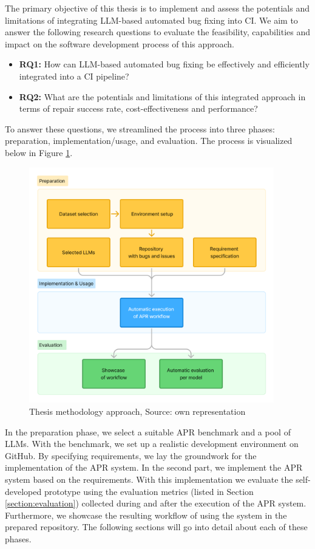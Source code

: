 The primary objective of this thesis is to implement and assess the potentials and limitations of integrating LLM-based automated bug fixing into \ac{CI}. We aim to answer the following research questions to evaluate the feasibility, capabilities and impact on the software development process of this approach.

\begin{itemize}
    \item \textbf{RQ1:} How can LLM-based automated bug fixing be effectively and efficiently integrated into a CI pipeline?
    \item \textbf{RQ2:} What are the potentials and limitations of this integrated approach in terms of repair success rate, cost-effectiveness and performance?
\end{itemize}

To answer these questions, we streamlined the process into three phases: preparation, implementation/usage, and evaluation. The process is visualized below in Figure \ref{fig:method-overview}.

\begin{figure}[H]
    \centering
    \includegraphics[width=0.95\textwidth]{images/flowcharts/method.png}
    \caption{Thesis methodology approach, Source: own representation}
    \label{fig:method-overview}
\end{figure}

In the preparation phase, we select a suitable \ac{APR} benchmark and a pool of \acp{LLM}. With the benchmark, we set up a realistic development environment on GitHub. By specifying requirements, we lay the groundwork for the implementation of the APR system.
In the second part, we implement the \ac{APR} system based on the requirements.
With this implementation we evaluate the self-developed prototype using the evaluation metrics (listed in Section \ref{section:evaluation}) collected during and after the execution of the APR system. Furthermore, we showcase the resulting workflow of using the system in the prepared repository.
The following sections will go into detail about each of these phases.

